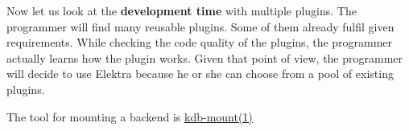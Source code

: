 Now let us look at the {\bfseries{development time}} with multiple plugins. The programmer will find many reusable plugins. Some of them already fulfil given requirements. While checking the code quality of the plugins, the programmer actually learns how the plugin works. Given that point of view, the programmer will decide to use Elektra because he or she can choose from a pool of existing plugins.


\begin{DoxyItemize}
\item The tool for mounting a backend is \mbox{\hyperlink{doc_help_kdb-mount_md}{kdb-\/mount(1)}} 
\end{DoxyItemize}
